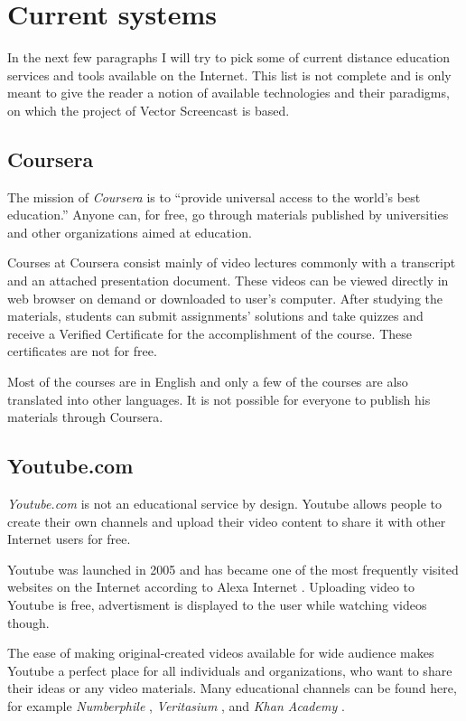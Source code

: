 \section{Current systems}
In the next few paragraphs I will try to pick some of current distance education services and tools available on the Internet. This list is not complete and is only meant to give the reader a notion of available technologies and their paradigms, on which the project of Vector Screencast is based.

\subsection{Coursera}
The mission of \textit{Coursera} is to ``provide universal access to the world’s best education.''\cite{9} Anyone can, for free, go through materials published by universities and other organizations aimed at education.

Courses at Coursera consist mainly of video lectures commonly with a transcript and an  attached presentation document. These videos can be viewed directly in web browser on demand or downloaded to user's computer. After studying the materials, students can submit assignments' solutions and take quizzes and receive a Verified Certificate for the accomplishment of the course. These certificates are not for free.

Most of the courses are in English and only a few of the courses are also translated into other languages. It is not possible for everyone to publish his materials through Coursera.



\subsection{Youtube.com}
\textit{Youtube.com} \cite{10} is not an educational service by design. Youtube allows people to create their own channels and upload their video content to share it with other Internet users for free.

Youtube was launched in 2005 and has became one of the most frequently visited websites on the Internet according to Alexa Internet \cite{11}. Uploading video to Youtube is free, advertisment is displayed to the user while watching videos though.

The ease of making original-created videos available for wide audience makes Youtube a perfect place for all individuals and organizations, who want to share their ideas or any video materials. Many educational channels can be found here, for example \textit{Numberphile} \cite{numberphile_youtube}, \textit{Veritasium} \cite{veritasium_youtube}, and \textit{Khan Academy} \cite{khan_academy_youtube}.

